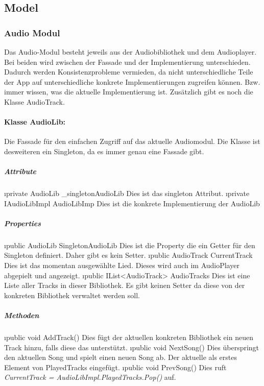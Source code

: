 \documentclass[../entwurf.tex]{subfiles}
\begin{document}
	\subsection{Model}
		\subsubsection{Audio Modul}
			Das Audio-Modul besteht jeweils aus der Audiobibliothek und dem Audioplayer.
			Bei beiden wird zwischen der Fassade und der Implementierung unterschieden.
			Dadurch werden Konsistenzprobleme vermieden, da nicht unterschiedliche Teile der App auf unterschiedliche konkrete Implementierungen
			zugreifen können. Bzw. immer wissen, was die aktuelle Implementierung ist.
			Zusätzlich gibt es noch die Klasse AudioTrack.
			\paragraph{Klasse AudioLib:}
				Die Fassade für den einfachen Zugriff auf das aktuelle Audiomodul.
				Die Klasse ist desweiteren ein Singleton, da es immer genau eine Fassade gibt.
				\subparagraph{Attribute}
					\begin{itemize}
						\i{private AudioLib \_singletonAudioLib} Dies ist das singleton Attribut.
						\i{private IAudioLibImpl AudioLibImp} Dies ist die konkrete Implementierung der
						AudioLib
					\end{itemize}
				\subparagraph{Properties}
					\begin{itemize}
						\i{public AudioLib SingletonAudioLib} Dies ist die Property die ein Getter für den 
						Singleton definiert. Daher gibt es kein Setter.
						\i{public AudioTrack CurrentTrack} Dies ist das momentan ausgewählte Lied. Dieses
						wird auch im AudioPlayer abgepielt und angezeigt. 
						\i{public IList<AudioTrack> AudioTracks} Dies ist eine Liste aller Tracks in dieser 
						Bibliothek. Es gibt keinen Setter da diese von der konkreten Bibliothek verwaltet werden soll.
					\end{itemize}
				\subparagraph{Methoden}
					\begin{itemize}
						\i{public void AddTrack()} Dies fügt der aktuellen konkreten Bibliothek ein neuen Track hinzu, 
						falls diese das unterstützt.
						\i{public void NextSong()} Dies überspringt den aktuellen Song und spielt einen neuen Song ab. 
						Der aktuelle als erstes Element von PlayedTracks eingefügt.
						\i{public void PrevSong()} Dies ruft \textit{CurrentTrack = AudioLibImpl.PlayedTracks.Pop()} auf.
					\end{itemize}
\end{document}

